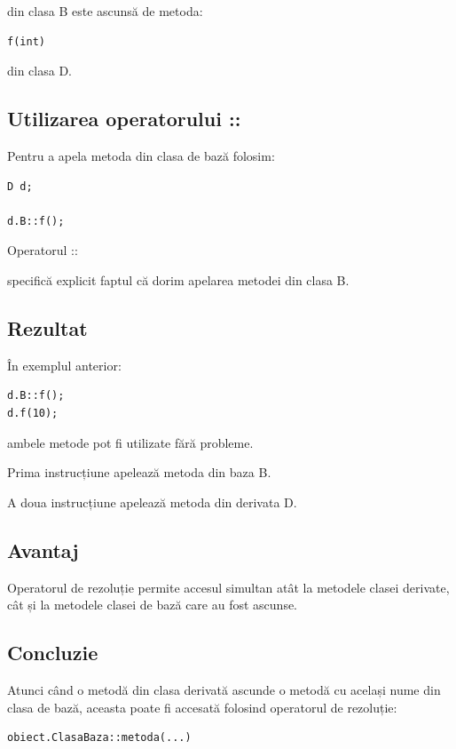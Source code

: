 \documentclass[12pt,a4paper]{article}
\begin{document}
din clasa B este ascunsă de metoda:

\begin{verbatim}
f(int)
\end{verbatim}

din clasa D.

\subsection{Utilizarea operatorului ::}

Pentru a apela metoda din clasa de bază folosim:

\begin{verbatim}
D d;

d.B::f();
\end{verbatim}

Operatorul ::

specifică explicit faptul că dorim apelarea metodei din clasa B.

\subsection{Rezultat}

În exemplul anterior:

\begin{verbatim}
d.B::f();
d.f(10);
\end{verbatim}

ambele metode pot fi utilizate fără probleme.

Prima instrucțiune apelează metoda din baza B.

A doua instrucțiune apelează metoda din derivata D.

\subsection{Avantaj}

Operatorul de rezoluție permite accesul simultan atât la metodele clasei derivate, cât și la metodele clasei de bază care au fost ascunse.

\subsection{Concluzie}

Atunci când o metodă din clasa derivată ascunde o metodă cu același nume din clasa de bază, aceasta poate fi accesată folosind operatorul de rezoluție:

\begin{verbatim}
obiect.ClasaBaza::metoda(...)
\end{verbatim}
\end{document}
